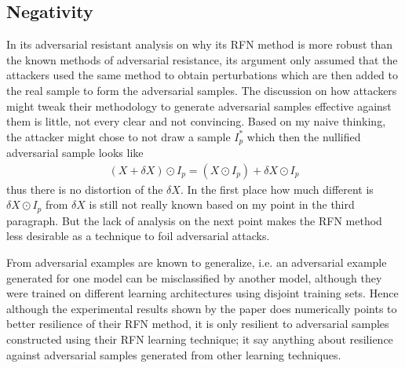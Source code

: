 \documentclass[a4paper,10pt]{article}
\theoremstyle{definition}
\begin{document}
%


\subsection*{Negativity}

In its adversarial resistant analysis on why its RFN method is more robust than the known methods of adversarial resistance, its argument only assumed that the attackers used the same method to obtain perturbations which are then added to the real sample to form the adversarial samples. The discussion on how attackers might tweak their methodology to generate adversarial samples effective against them is little, not every clear and not convincing. Based on my naive thinking, the attacker might chose to not draw a sample $I_p^\ast$ which then the nullified adversarial sample looks like
\begin{align*}
(X+\delta X ) \odot I_p = (X \odot I_p) + \delta X\odot I_p
\end{align*}
thus there is no distortion of the $\delta X$. In the first place how much different is $\delta X \odot I_p$ from $\delta X$ is still not really known based on my point in the third paragraph. But the lack of analysis on the next point makes the RFN method less desirable as a technique to foil adversarial attacks.


From \cite{goodfellow2014explaining} adversarial examples are known to generalize, i.e. an adversarial example generated for one model can be misclassified by another model, although they were trained on different learning architectures using disjoint training sets. Hence although the experimental results shown by the paper does numerically points to better resilience of their RFN method, it is only resilient to adversarial samples constructed using their RFN learning technique; it say anything about resilience against adversarial samples generated from other learning techniques. 
\end{document}

